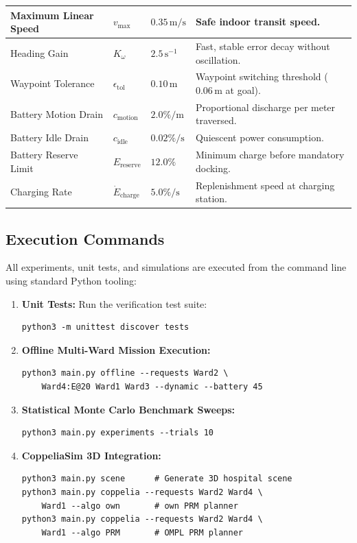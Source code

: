 \documentclass[12pt,a4paper]{article}
\begin{document}
\begin{table}[H]
{\begin{tabular}{|P{4.4cm}|C{1.8cm}|C{2.4cm}|P{6.6cm}|}
Maximum Linear Speed & $v_{\max}$ & $0.35\,\text{m/s}$ & Safe indoor transit speed. \\ \hline
Heading Gain & $K_\omega$ & $2.5\,\text{s}^{-1}$ & Fast, stable error decay without oscillation. \\ \hline
Waypoint Tolerance & $\epsilon_{\text{tol}}$ & $0.10\,\text{m}$ & Waypoint switching threshold ($0.06\,\text{m}$ at goal). \\ \hline
Battery Motion Drain & $c_{\text{motion}}$ & $2.0\%/\text{m}$ & Proportional discharge per meter traversed. \\ \hline
Battery Idle Drain & $c_{\text{idle}}$ & $0.02\%/\text{s}$ & Quiescent power consumption. \\ \hline
Battery Reserve Limit & $E_{\text{reserve}}$ & $12.0\%$ & Minimum charge before mandatory docking. \\ \hline
Charging Rate & $\dot{E}_{\text{charge}}$ & $5.0\%/\text{s}$ & Replenishment speed at charging station. \\ \hline
\end{tabular}%
}
\end{table}

\subsection{Execution Commands}
All experiments, unit tests, and simulations are executed from the command line using standard Python tooling:
\begin{enumerate}[itemsep=2pt,topsep=2pt]
\item \textbf{Unit Tests:} Run the verification test suite:
{\small
\begin{verbatim}
python3 -m unittest discover tests
\end{verbatim}}
\item \textbf{Offline Multi-Ward Mission Execution:}
{\small
\begin{verbatim}
python3 main.py offline --requests Ward2 \
    Ward4:E@20 Ward1 Ward3 --dynamic --battery 45
\end{verbatim}}
\item \textbf{Statistical Monte Carlo Benchmark Sweeps:}
{\small
\begin{verbatim}
python3 main.py experiments --trials 10
\end{verbatim}}
\item \textbf{CoppeliaSim 3D Integration:}
{\small
\begin{verbatim}
python3 main.py scene      # Generate 3D hospital scene
python3 main.py coppelia --requests Ward2 Ward4 \
    Ward1 --algo own       # own PRM planner
python3 main.py coppelia --requests Ward2 Ward4 \
    Ward1 --algo PRM       # OMPL PRM planner
\end{verbatim}}
\end{enumerate}
\end{document}

